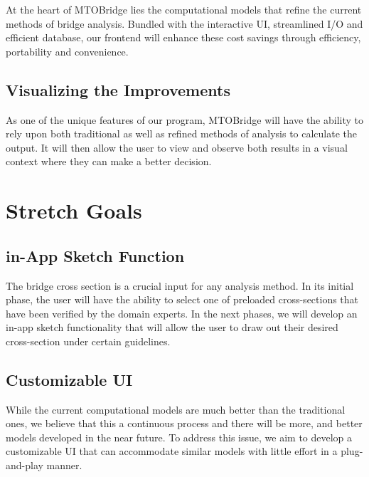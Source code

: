 \documentclass{article}
\begin{document}
At the heart of MTOBridge lies the computational models that refine the current methods of bridge analysis. Bundled with the interactive UI, streamlined I/O and efficient database, our frontend will enhance these cost savings through efficiency, portability and convenience. 

\subsection {Visualizing the Improvements}

As one of the unique features of our program, MTOBridge will have the ability to rely upon both traditional as well as refined methods of analysis to calculate the output. It will then allow the user to view and observe both results in a visual context where they can make a better decision.  

\section{Stretch Goals}

\subsection {in-App Sketch Function}

The bridge cross section is a crucial input for any analysis method. In its initial phase, the user will have the ability to select one of preloaded cross-sections that have been verified by the domain experts. In the next phases, we will develop an in-app sketch functionality that will allow the user to draw out their desired cross-section under certain guidelines. 

\subsection {Customizable UI}

While the current computational models are much better than the traditional ones, we believe that this a continuous process and there will be more, and better models developed in the near future. To address this issue, we aim to develop a customizable UI that can accommodate similar models with little effort in a plug-and-play manner. 
\end{document}
